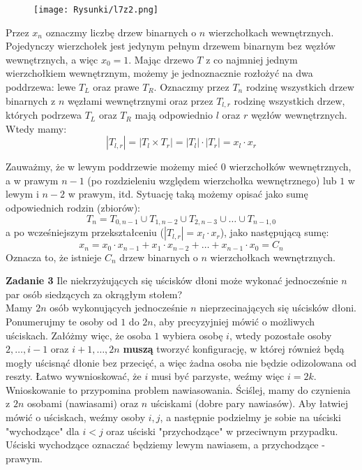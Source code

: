 \documentclass[a4paper,12pt]{article}
\newcommand{\abs}[1]{\left| #1 \right|}					%
\begin{document}
\begin{figure}[H]
	\centering
	\texttt{[image: Rysunki/l7z2.png]}
\end{figure}

\noindent Przez $x_n$ oznaczmy liczbę drzew binarnych o $n$ wierzchołkach wewnętrznych.  Pojedynczy wierzchołek jest jedynym pełnym drzewem binarnym bez węzłów wewnętrznych, a więc $x_0 = 1$. Mając drzewo $T$ z co najmniej jednym wierzchołkiem wewnętrznym, możemy je jednoznacznie rozłożyć na dwa poddrzewa: lewe $T_L$ oraz prawe $T_R$. Oznaczmy przez $T_n$ rodzinę wszystkich drzew binarnych z $n$ węzłami wewnętrznymi oraz przez $T_{l, r}$ rodzinę wszystkich drzew, których podrzewa $T_L$ oraz $T_R$ mają odpowiednio $l$ oraz $r$ węzłów wewnętrznych. Wtedy mamy:
\[ \abs{T_{l, r}} = \abs{T_l \times T_r} = \abs{T_l} \cdot \abs{T_r} = x_l \cdot x_r \]

\noindent Zauważmy, że w lewym poddrzewie możemy mieć $0$ wierzchołków wewnętrznych, a w prawym $n-1$ (po rozdzieleniu względem wierzchołka wewnętrznego) lub $1$ w lewym i $n-2$ w prawym, itd. Sytuację taką możemy opisać jako sumę odpowiednich rodzin (zbiorów):
\[ T_n = T_{0, n - 1} \cup T_{1, n - 2} \cup T_{2, n - 3} \cup \ldots \cup T_{n-1, 0} \]
a po wcześniejszym przekształceniu ($\abs{T_{l, r}} = x_l \cdot x_r$), jako następującą sumę:
\[ x_n = x_0 \cdot x_{n-1} + x_1 \cdot x_{n-2} + \ldots + x_{n-1} \cdot x_0 = C_n \]
Oznacza to, że istnieje $C_n$ drzew binarnych o $n$ wierzchołkach wewnętrznych.

\newpage
\noindent \textbf{Zadanie 3} \newline
Ile niekrzyżujących się uścisków dłoni może wykonać jednocześnie $n$ par osób siedzących za okrągłym stołem? \\

\noindent Mamy $2n$ osób wykonujących jednocześnie $n$ nieprzecinających się uścisków dłoni. Ponumerujmy te osoby od $1$ do $2n$, aby precyzyjniej mówić o możliwych uściskach. Załóżmy więc, że osoba $1$ wybiera osobę $i$, wtedy pozostałe osoby $2, \ldots, i - 1$ oraz $i + 1, \ldots, 2n$ \textbf{muszą} tworzyć konfigurację, w której  również będą mogły uścisnąć dłonie bez przecięć, a więc żadna osoba nie będzie odizolowana od reszty. Łatwo wywnioskować, że $i$ musi być parzyste, weźmy więc $i = 2k$. \\

\noindent Wnioskowanie to przypomina problem nawiasowania. Ściślej, mamy do czynienia z $2n$ osobami (nawiasami) oraz $n$ uściskami (dobre pary nawiasów). Aby łatwiej mówić o uściskach, weźmy osoby $i, j$, a następnie podzielmy je sobie na uściski "wychodzące" dla $i < j$ oraz uściski "przychodzące" w przeciwnym przypadku. Uściski wychodzące oznaczać będziemy lewym nawiasem, a przychodzące - prawym. \\
\end{document}
